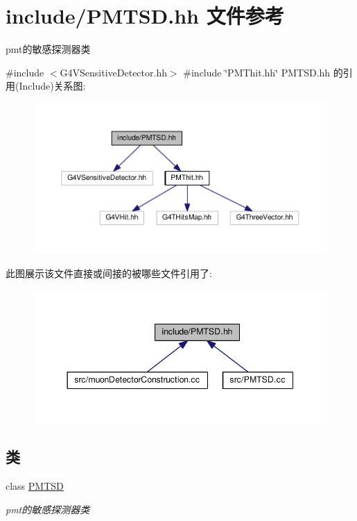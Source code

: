 \hypertarget{PMTSD_8hh}{}\section{include/\+P\+M\+T\+SD.hh 文件参考}
\label{PMTSD_8hh}


pmt的敏感探测器类  


{\ttfamily \#include $<$G4\+V\+Sensitive\+Detector.\+hh$>$}\newline
{\ttfamily \#include \char`\"{}P\+M\+Thit.\+hh\char`\"{}}\newline
P\+M\+T\+S\+D.\+hh 的引用(Include)关系图\+:\nopagebreak
\begin{figure}[H]
\begin{center}
\leavevmode
\includegraphics[width=350pt]{PMTSD_8hh__incl}
\end{center}
\end{figure}
此图展示该文件直接或间接的被哪些文件引用了\+:\nopagebreak
\begin{figure}[H]
\begin{center}
\leavevmode
\includegraphics[width=344pt]{PMTSD_8hh__dep__incl}
\end{center}
\end{figure}
\subsection*{类}
\begin{DoxyCompactItemize}
\item 
class \hyperlink{classPMTSD}{P\+M\+T\+SD}
\begin{DoxyCompactList}\small\item\em pmt的敏感探测器类 \end{DoxyCompactList}\end{DoxyCompactItemize}


